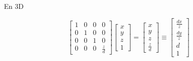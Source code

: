\documentclass[compress]{beamer}
\begin{document}
\begin{frame}{En 3D}
    \begin{center}
\[
    \begin{bmatrix} 1 & 0 & 0 & 0\\ 
                    0 & 1 & 0 & 0\\
                    0 & 0 & 1 & 0 \\
                    0 & 0 & 0 & \frac{z}{d}
\end{bmatrix} \begin{bmatrix} x \\ y \\ z \\ 1 \end{bmatrix}
= \begin{bmatrix} x \\ y \\ z \\ \frac{z}{d} \end{bmatrix} 
\equiv \begin{bmatrix} \frac{dx}{z} \\ \frac{dy}{z} \\ d \\ 1 \end{bmatrix} 
\]

\end{center}

\end{frame}
\end{document}
